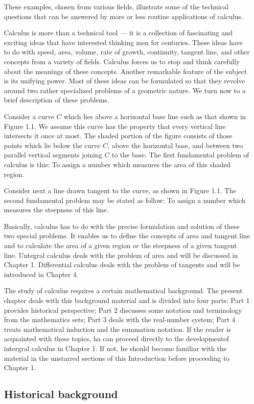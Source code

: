 \documentclass[cn,11pt,chinese]{elegantbook}
\numberwithin{equation}{section}
\begin{document}
These examples, chosen from various fields, illustrate some of the technical questions that can be answered by more or less routine applications of calculus.

Calculus is more than a technical tool --- it is a collection of fascinating and exciting ideas that have interested thinking men for centuries. These ideas have to do with speed, area, volume, rate of growth, continuity, tangent line, and other concepts from a variety of fields. Calculus forces us to stop and think carefully about the meanings  of these concepts. Another remarkable feature of the subject is its unifying power. Most of these ideas can be formulated so that they revolve around two rather specialized problems of a geometric nature. We turn now to a brief description of these problems.

Consider a curve $C$ which lies above a horizontal base line such as that shown in Figure 1.1. We assume this curve has the property that every vertical line intersects it once at most. The shaded portion of the figure consists of those points which lie below the curve $C$, above the horizontal base, and between two parallel vertical segments joining $C$ to the base. The first fundamental problem of calculus is this: To assign a number which measures the area of this shaded region.

Consider next a line drawn tangent to the curve, as shown in  Figure 1.1. The second fundamental problem may be stated as follow: To assign a number which measures the steepness of this line.

Basically, calculus has to do with the precise formulation and solution of these two special problems. It enables us to define the concepts of area and tangent line and to calculate the area of a given region or the steepness of a given tangent line. Untegral calculus deals with the problem of area and will be discussed in Chapter 1. Differential calculus deals with the problem of tangents and will be introduced in Chapter 4.

The study of calculus requires a certain mathematical background. The present chapter deals with this background material and is divided into four parts: Part 1 provides historical perspective; Part 2 discusses some notation and terminology from the mathematics sets; Part 3 deals with the real-number system; Part 4 treats mathematical induction and the summation notation. If the reader is acquainted with these topics, ha can proceed directly to the developmentof intergral calculus in Chapter 1. If not, he should become familiar with the material in the unstarred sections of this Introduction before proceeding to Chapter 1.

\subsection{Historical background} 



% 

\appendix
\end{document}
